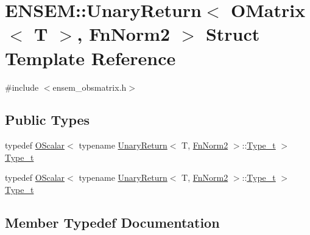 \hypertarget{structENSEM_1_1UnaryReturn_3_01OMatrix_3_01T_01_4_00_01FnNorm2_01_4}{}\section{E\+N\+S\+EM\+:\+:Unary\+Return$<$ O\+Matrix$<$ T $>$, Fn\+Norm2 $>$ Struct Template Reference}
\label{structENSEM_1_1UnaryReturn_3_01OMatrix_3_01T_01_4_00_01FnNorm2_01_4}


{\ttfamily \#include $<$ensem\+\_\+obsmatrix.\+h$>$}

\subsection*{Public Types}
\begin{DoxyCompactItemize}
\item 
typedef \mbox{\hyperlink{classENSEM_1_1OScalar}{O\+Scalar}}$<$ typename \mbox{\hyperlink{structENSEM_1_1UnaryReturn}{Unary\+Return}}$<$ T, \mbox{\hyperlink{structENSEM_1_1FnNorm2}{Fn\+Norm2}} $>$\+::\mbox{\hyperlink{structENSEM_1_1UnaryReturn_3_01OMatrix_3_01T_01_4_00_01FnNorm2_01_4_a4ec82ac7d8a71ef886cafde5b7ecff03}{Type\+\_\+t}} $>$ \mbox{\hyperlink{structENSEM_1_1UnaryReturn_3_01OMatrix_3_01T_01_4_00_01FnNorm2_01_4_a4ec82ac7d8a71ef886cafde5b7ecff03}{Type\+\_\+t}}
\item 
typedef \mbox{\hyperlink{classENSEM_1_1OScalar}{O\+Scalar}}$<$ typename \mbox{\hyperlink{structENSEM_1_1UnaryReturn}{Unary\+Return}}$<$ T, \mbox{\hyperlink{structENSEM_1_1FnNorm2}{Fn\+Norm2}} $>$\+::\mbox{\hyperlink{structENSEM_1_1UnaryReturn_3_01OMatrix_3_01T_01_4_00_01FnNorm2_01_4_a4ec82ac7d8a71ef886cafde5b7ecff03}{Type\+\_\+t}} $>$ \mbox{\hyperlink{structENSEM_1_1UnaryReturn_3_01OMatrix_3_01T_01_4_00_01FnNorm2_01_4_a4ec82ac7d8a71ef886cafde5b7ecff03}{Type\+\_\+t}}
\end{DoxyCompactItemize}


\subsection{Member Typedef Documentation}
\mbox{\label{structENSEM_1_1UnaryReturn_3_01OMatrix_3_01T_01_4_00_01FnNorm2_01_4_a4ec82ac7d8a71ef886cafde5b7ecff03}} 
